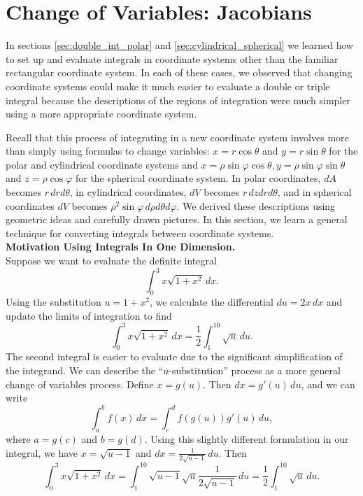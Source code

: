 \section{Change of Variables: Jacobians}\label{sec:Jacobian}

In sections \ref{sec:double_int_polar} and \ref{sec:cylindrical_spherical} we learned how to set up and evaluate integrals in coordinate systems other than the familiar rectangular coordinate system.  In each of these cases, we observed that changing coordinate systems could make it much easier to evaluate a double or triple integral because the descriptions of the regions of integration were much simpler using a more appropriate coordinate system.

Recall that this process of integrating in a new coordinate system involves more than simply using formulas to change variables: $x = r\cos \theta$ and $y = r\sin \theta$ for the polar and cylindrical coordinate systems and $x = \rho\sin\varphi \cos \theta, y = \rho\sin\varphi\sin\theta$ and $z = \rho\cos\varphi$ for the spherical coordinate system.  In polar coordinates, $dA$ becomes $r\,drd\theta$, in cylindrical coordinates, $dV$ becomes $r\,dzdrd\theta$, and in spherical coordinates $dV$ becomes $\rho^2\sin\varphi \,d\rho d\theta d\varphi.$  We derived these descriptions using geometric ideas and carefully drawn pictures.  In this section, we learn a general technique for converting integrals between coordinate systems.\\

\noindent\textbf{\large Motivation Using Integrals In One Dimension.}\\

Suppose we want to evaluate the definite integral
\[
	\int_0^3 x\sqrt{1+x^2}\,dx.
\]
Using the substitution $u= 1+x^2$, we calculate the differential $du = 2x\,dx$ and update the limits of integration to find
\[
	\int_0^3 x\sqrt{1+x^2}\,dx = \frac{1}{2}\int_1^{10} \sqrt{u}\,du.
\]
The second integral is easier to evaluate due to the significant simplification of the integrand.  We can describe the ``$u$-substitution'' process as a more general change of variables process.  Define $x = g(u)$.  Then $dx = g'(u)\,du$, and we can write
\[
	\int_a^b f(x)\,dx = \int_c^d f(g(u))g'(u)\,du,
\]
where $a = g(c)$ and $b = g(d)$.  Using this slightly different formulation in our integral, we have $x = \sqrt{u-1}$ and $dx = \frac{1}{2\sqrt{u-1}}\,du.$  Then
\[
	\int_0^3 x\sqrt{1+x^2}\,dx = \int_1^{10} \sqrt{u-1}\sqrt{u}\frac{1}{2\sqrt{u-1}}\,du =  \frac{1}{2}\int_1^{10} \sqrt{u}\,du.
\]

